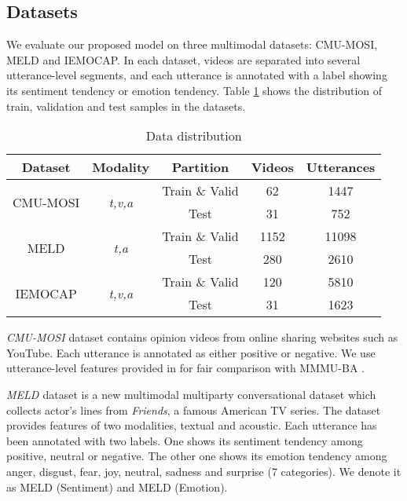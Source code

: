 \documentclass[sigconf]{acmart}
\begin{document}
	\subsection{Datasets}
	We evaluate our proposed model on three multimodal datasets: CMU-MOSI, MELD and IEMOCAP. In each dataset, videos are separated into several utterance-level segments, and each utterance is annotated with a label showing its sentiment tendency or emotion tendency. Table \ref{tab:datadistribution} shows the distribution of train, validation and test samples in the datasets.
	\begin{table}[htbp]
		\centering
		\caption{Data distribution}
\begin{tabular}{|c|c|c|c|c|}
				\hline
				Dataset & Modality & {Partition} & {Videos} & {Utterances} \\
				\hline
				\hline
				\multirow{2}[4]{*}{CMU-MOSI} & \multirow{2}[4]{*}{\textit{{t,v,a}}} & Train \& Valid & 62    & 1447 \\
				\cline{3-5}          &       & Test  & 31    & 752 \\
				\hline
				\multirow{2}[4]{*}{MELD} & \multirow{2}[4]{*}{\textit{{t,a}}} & Train \& Valid & 1152  & 11098 \\
				\cline{3-5}          &       & Test  & 280   & 2610 \\
				\hline
				\multirow{2}[4]{*}{IEMOCAP} & \multirow{2}[4]{*}{\textit{{t,v,a}}} & Train \& Valid & 120   & 5810 \\
				\cline{3-5}          &       & Test  & 31    & 1623 \\
				\hline
		\end{tabular}
\label{tab:datadistribution}\end{table}\textit{CMU-MOSI \cite{zadeh2016mosi}} dataset contains opinion videos from online sharing websites such as YouTube. Each utterance is annotated as either positive or negative. We use utterance-level features provided in \citet{poria2017context} for fair comparison with MMMU-BA \cite{ghosal2018contextual}.
	
	\textit{MELD \cite{poria2018meld}} dataset is a new multimodal multiparty conversational dataset which collects actor's lines from \textit{Friends}, a famous American TV series. The dataset provides features of two modalities, textual and acoustic. Each utterance has been annotated with two labels. One shows its sentiment tendency among positive, neutral or negative. The other one shows its emotion tendency among anger, disgust, fear, joy, neutral, sadness and surprise (7 categories). We denote it as MELD (Sentiment) and MELD (Emotion). 
	
\end{document}
